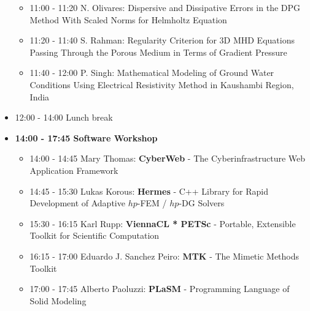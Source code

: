 \documentclass[10pt, A4]{article}%
\begin{document}
\begin{itemize}
\begin{itemize}
    \item 11:00 - 11:20 {N. Olivares}: {Dispersive and Dissipative Errors in the DPG Method With Scaled Norms for Helmholtz Equation}
    \item 11:20 - 11:40 {S. Rahman}: {Regularity Criterion for 3D MHD Equations Passing Through the Porous Medium in Terms of Gradient Pressure} %
    \item 11:40 - 12:00 {P. Singh}: {Mathematical Modeling of Ground Water Conditions Using Electrical Resistivity Method in Kaushambi Region, India} %
  \end{itemize}
  \item 12:00 - 14:00 Lunch break
  \item {\bf 14:00 - 17:45 Software Workshop}
  \begin{itemize}
    \item 14:00 - 14:45 Mary Thomas: {\bf CyberWeb} - The Cyberinfrastructure Web Application Framework
    \item 14:45 - 15:30 Lukas Korous: {\bf Hermes} - C++ Library for Rapid Development of Adaptive $hp$-FEM / $hp$-DG Solvers
    \item 15:30 - 16:15 Karl Rupp: {\bf ViennaCL * PETSc} - Portable, Extensible Toolkit for Scientific Computation
    \item 16:15 - 17:00 Eduardo J. Sanchez Peiro: {\bf MTK} - The Mimetic Methods Toolkit 
    \item 17:00 - 17:45 Alberto Paoluzzi: {\bf PLaSM} - Programming Language of Solid Modeling
  \end{itemize}

\end{itemize}
\end{document}
